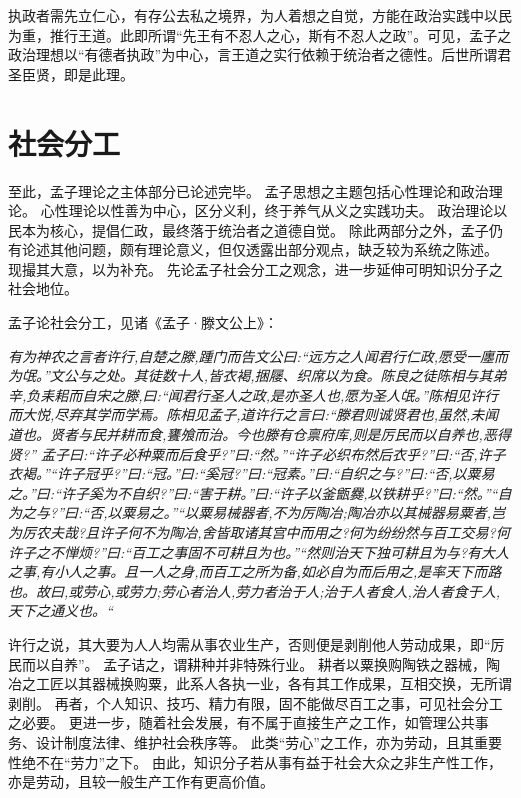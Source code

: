 \documentclass[11pt]{article}
\begin{document}
执政者需先立仁心，有存公去私之境界，为人着想之自觉，方能在政治实践中以民为重，推行王道。此即所谓“先王有不忍人之心，斯有不忍人之政”。可见，孟子之政治理想以“有德者执政”为中心，言王道之实行依赖于统治者之德性。后世所谓君圣臣贤，即是此理。
  
\section{社会分工}
至此，孟子理论之主体部分已论述完毕。
孟子思想之主题包括心性理论和政治理论。
心性理论以性善为中心，区分义利，终于养气从义之实践功夫。
政治理论以民本为核心，提倡仁政，最终落于统治者之道德自觉。
除此两部分之外，孟子仍有论述其他问题，颇有理论意义，但仅透露出部分观点，缺乏较为系统之陈述。
现撮其大意，以为补充。
先论孟子社会分工之观念，进一步延伸可明知识分子之社会地位。

\newline

孟子论社会分工，见诸《孟子·滕文公上》：

\textit{有为神农之言者许行,自楚之滕,踵门而告文公曰:“远方之人闻君行仁政,愿受一廛而为氓。”文公与之处。其徒数十人,皆衣褐,捆屦、织席以为食。陈良之徒陈相与其弟辛,负耒耜而自宋之滕,曰:“闻君行圣人之政,是亦圣人也,愿为圣人氓。”陈相见许行而大悦,尽弃其学而学焉。陈相见孟子,道许行之言曰:“滕君则诚贤君也,虽然,未闻道也。贤者与民并耕而食,饔飧而治。今也滕有仓禀府库,则是厉民而以自养也,恶得贤?”
孟子曰:“许子必种粟而后食乎?”曰:“然。”“许子必织布然后衣乎?”曰:“否,许子衣褐。”“许子冠乎?”曰:“冠。”曰:“奚冠?”曰:“冠素。”曰:“自织之与?”曰:“否,以粟易之。”曰:“许子奚为不自织?”曰:“害于耕。”曰:“许子以釜甑爨,以铁耕乎?”曰:“然。”“自为之与?”曰:“否,以粟易之。”“以粟易械器者,不为厉陶冶;陶冶亦以其械器易粟者,岂为厉农夫哉?且许子何不为陶冶,舍皆取诸其宫中而用之?何为纷纷然与百工交易?何许子之不惮烦?”曰:“百工之事固不可耕且为也。”“然则治天下独可耕且为与?有大人之事,有小人之事。且一人之身,而百工之所为备,如必自为而后用之,是率天下而路也。故曰,或劳心,或劳力;劳心者治人,劳力者治于人;治于人者食人,治人者食于人,天下之通义也。“}

许行之说，其大要为人人均需从事农业生产，否则便是剥削他人劳动成果，即“厉民而以自养”。
孟子诘之，谓耕种并非特殊行业。
耕者以粟换购陶铁之器械，陶冶之工匠以其器械换购粟，此系人各执一业，各有其工作成果，互相交换，无所谓剥削。
再者，个人知识、技巧、精力有限，固不能做尽百工之事，可见社会分工之必要。
更进一步，随着社会发展，有不属于直接生产之工作，如管理公共事务、设计制度法律、维护社会秩序等。
此类“劳心”之工作，亦为劳动，且其重要性绝不在“劳力”之下。
由此，知识分子若从事有益于社会大众之非生产性工作，亦是劳动，且较一般生产工作有更高价值。
  
\end{document}
